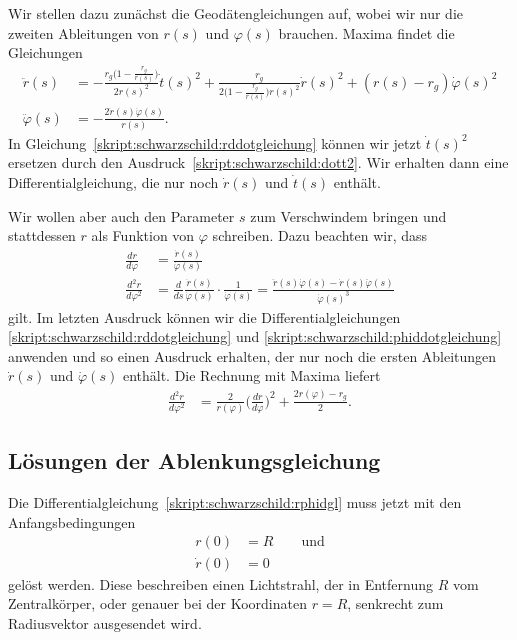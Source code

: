 Wir stellen dazu zunächst die Geodätengleichungen auf, wobei wir
nur die zweiten Ableitungen von $r(s)$ und $\varphi(s)$ brauchen.
Maxima findet die Gleichungen
\begin{align}
\ddot r(s)
&=
-\frac{r_g\biggl(\displaystyle 1-\frac{r_g}{r(s)}\biggr)}{2r(s)^2}\dot t(s)^2
+
\frac{r_g}{2\biggl(1-\displaystyle\frac{r_g}{r(s)}\biggr) r(s)^2}\dot r(s)^2
+
(r(s)-r_g)\dot\varphi(s)^2
\label{skript:schwarzschild:rddotgleichung}
\\
\ddot\varphi(s)
&=
-\frac{2\dot r(s)\dot \varphi(s)}{r(s)}.
\label{skript:schwarzschild:phiddotgleichung}
\end{align}
In Gleichung~\eqref{skript:schwarzschild:rddotgleichung} können wir jetzt
$\dot t(s)^2$ ersetzen durch den Ausdruck~\eqref{skript:schwarzschild:dott2}.
Wir erhalten dann eine Differentialgleichung, die nur noch $\dot r(s)$ und
$\dot t(s)$ enthält.

Wir wollen aber auch den Parameter $s$ zum Verschwindem bringen und
stattdessen $r$ als Funktion von $\varphi$ schreiben.
Dazu beachten wir, dass
\begin{align*}
\frac{dr}{d\varphi}
&=
\frac{\dot r(s)}{\dot \varphi(s)}
\\
\frac{d^2r}{d\varphi^2}
&=
\frac{d}{ds}
\frac{\dot r(s)}{\dot \varphi(s)}
\cdot
\frac{1}{\dot\varphi(s)}
=
\frac{\ddot r(s)\dot \varphi(s) - \dot r(s)\ddot\varphi(s)}{\dot\varphi(s)^3}
\end{align*}
gilt.
Im letzten Ausdruck können wir die Differentialgleichungen
\eqref{skript:schwarzschild:rddotgleichung}
und
\eqref{skript:schwarzschild:phiddotgleichung}
anwenden und so einen Ausdruck erhalten, der nur noch die ersten Ableitungen 
$\dot r(s)$ und $\dot\varphi(s)$ enthält.
Die Rechnung mit Maxima liefert
\begin{align}
\frac{d^2r}{d\varphi^2}
&=
\frac{2}{r(\varphi)}
\biggl(\frac{dr}{d\varphi}\biggr)^2
+\frac{2r(\varphi)-r_g}{2}.
\label{skript:schwarzschild:rphidgl}
\end{align}

\subsection{Lösungen der Ablenkungsgleichung}
Die Differentialgleichung~\eqref{skript:schwarzschild:rphidgl}
muss jetzt mit den Anfangsbedingungen
\begin{align*}
r(0)&= R\qquad\text{und}
\\
\dot r(0)&=0
\end{align*}
gelöst werden.
Diese beschreiben einen Lichtstrahl, der in Entfernung $R$ vom Zentralkörper,
oder genauer bei der Koordinaten $r=R$, senkrecht zum Radiusvektor
ausgesendet wird.

